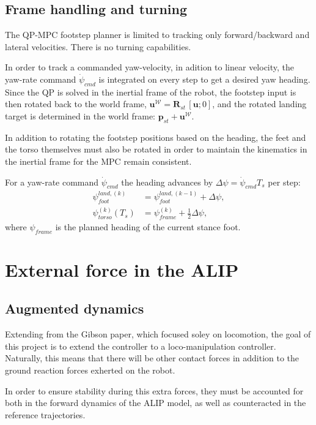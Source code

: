 \documentclass[11pt]{article}
\theoremstyle{remark}
\theoremstyle{definition}
\newcommand{\uu}{\bm{u}}
\newcommand{\p}{\bm{p}}
\newcommand{\Rot}{\bm{R}}
\begin{document}
\subsection{Frame handling and turning}
The QP-MPC footstep planner is limited to tracking only forward/backward and lateral velocities. There is no turning capabilities. 

In order to track a commanded yaw-velocity, in adition to linear velocity, the yaw-rate command $\dot\psi_{cmd}$ is integrated on every step 
to get a desired yaw heading.
Since the QP is solved in the inertial frame of the robot, the footstep input is then rotated back to the world frame, $\uu^{\mathcal W}=\Rot_{st}\,[\uu;0]$, and the
rotated landing target is determined in the world frame: $\p_{st}+\uu^{\mathcal W}$. 

In addition to rotating the footstep positions based on the heading, the feet and the torso themselves must also be rotated in order to maintain 
the kinematics in the inertial frame for the MPC remain consistent. 

For a yaw-rate command $\dot\psi_{cmd}$ the heading advances by $\Delta\psi=\dot\psi_{cmd}T_s$ per step:
\begin{align}
  \psi_{foot}^{land,(k)}&=\psi_{foot}^{land,(k-1)}+\Delta\psi, \\
  \psi_{torso}^{(k)}(T_s)&=\psi_{frame}^{(k)}+\tfrac12\Delta\psi,
\end{align}
where $\psi_{frame}$ is the planned heading of the current stance foot. 


\section{External force in the ALIP}\label{sec:alipforce}
\subsection{Augmented dynamics}
Extending from the Gibson paper, which focused soley on locomotion, the goal of this project is to extend the controller to a loco-manipulation 
controller. Naturally, this means that there will be other contact forces in addition to the ground reaction forces exherted on the robot.

In order to ensure stability during this extra forces, they must be accounted for both in the forward dynamics of the ALIP model, 
as well as counteracted in the reference trajectories. 
\end{document}
